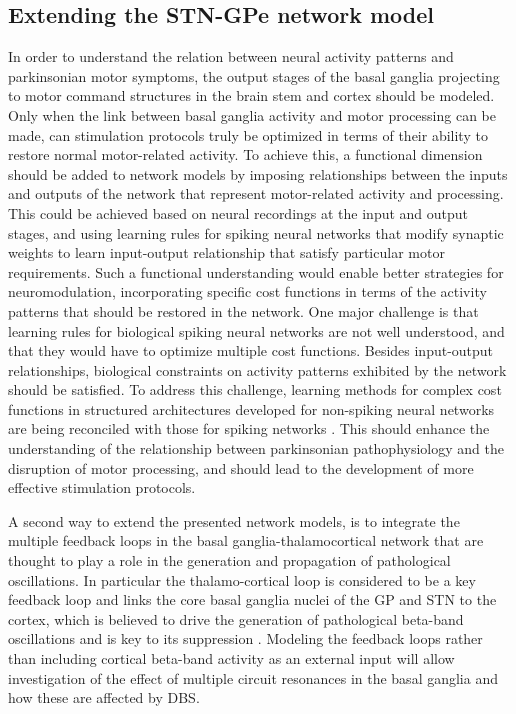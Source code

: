 \subsection{Extending the STN-GPe network model}
%
%
%
%
%
%
%
%
%
In order to understand the relation between neural activity patterns and parkinsonian
motor symptoms, the output stages of the basal ganglia projecting to motor command
structures in the brain stem and cortex should be modeled. Only when the link
between basal ganglia activity and motor processing can be made, can stimulation
protocols truly be optimized in terms of their ability to restore normal motor-related activity.
To achieve this, a functional dimension should be added to network models
by imposing relationships between the inputs and outputs
of the network that represent motor-related activity and processing.
This could be achieved based on neural recordings at the input
and output stages, and using learning rules for spiking neural networks
that modify synaptic weights \cite{abbott_building_2016} to learn
input-output relationship that satisfy particular motor requirements.
Such a functional understanding would enable
better strategies for neuromodulation, incorporating specific cost functions
in terms of the activity patterns that should be restored in the network.
One major challenge is that learning rules for biological spiking neural networks
are not well understood, and that they would have to optimize multiple
cost functions. Besides input-output relationships, biological
constraints on activity patterns exhibited by the network should be satisfied.
To address this challenge, learning methods for complex cost functions in structured
architectures developed for non-spiking neural networks are being reconciled
with those for spiking networks \cite{marblestone_toward_2016,abbott_building_2016,depasquale_using_2016}.
This should enhance the understanding of the relationship between
parkinsonian pathophysiology and the disruption of motor processing,
and should lead to the development of more effective stimulation protocols. %

%
A second way to extend the presented network models, is to integrate
the multiple feedback loops in the basal ganglia-thalamocortical network
that are thought to play a role in the generation and propagation of pathological
oscillations. In particular the thalamo-cortical loop is considered to be a key
feedback loop \cite{pavlides_computational_2015,reis_thalamocortical_2019} and
links the core basal ganglia nuclei of the GP and STN to the cortex,
which is believed to drive the generation of pathological beta-band oscillations
\cite{sherman_neural_2016} and is key to its suppression \cite{li_resonant_2007,li_therapeutic_2012}.
Modeling the feedback loops rather than including cortical beta-band activity
as an external input will allow investigation of the effect of multiple
circuit resonances in the basal ganglia and how these are affected by DBS.



